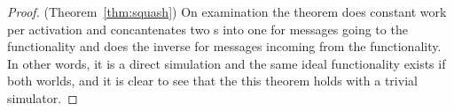 \begin{proof} (Theorem~\ref{thm:squash})
On examination the  theorem does constant work per activation and concantenates two s into one for messages going to the functionality and does the inverse for messages incoming from the functionality.
In other words, it is a direct simulation and the same ideal functionality exists if both worlds, and it is clear to see that the this theorem holds with a trivial simulator.
%
%
%
\end{proof}
